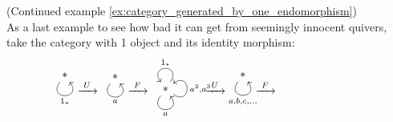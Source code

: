 \begin{example}{(Continued example \ref{ex:category_generated_by_one_endomorphism})}\label{ex:U-F-U-F_from_singleton}\\

As a last example to see how bad it can get from seemingly innocent quivers, take the category with 1 object and its identity morphism:
\[
\noindent\begin{minipage}{.005\textwidth}
\phantom{}
\end{minipage}
\begin{minipage}{.08\textwidth}
\begin{tikzcd}
\ast \arrow["1_{\ast}"', loop, distance=2em, in=305, out=235]
\end{tikzcd}
\end{minipage}
%
\begin{minipage}{.05\textwidth}
$\xrightarrow{\text{     }U\text{     }}$
\end{minipage}
%
\begin{minipage}{.08\textwidth}
\begin{tikzcd}
\ast \arrow["a"', loop, distance=2em, in=305, out=235]
\end{tikzcd}
\end{minipage}
%
\begin{minipage}{.05\textwidth}
$\xrightarrow{\text{     }F\text{     }}$
\end{minipage}
%
\begin{minipage}{.15\textwidth}
\begin{tikzcd}
\ast \arrow["a"', loop, distance=2em, in=305, out=235] \arrow["1_{\ast}"', loop, distance=2em, in=125, out=55] \arrow["{a^{2}, a^{3},\dots}"', loop, distance=2em, in=35, out=325]
\end{tikzcd}
\end{minipage}
%
\begin{minipage}{.05\textwidth}
$\xrightarrow{\text{     }U\text{     }}$
\end{minipage}
%
\begin{minipage}{.08\textwidth}
\begin{tikzcd}
\ast \arrow["{a, b, c,\dots}"', loop, distance=2em, in=305, out=235]
\end{tikzcd}
\end{minipage}
%
\begin{minipage}{.05\textwidth}
$\xrightarrow{\text{     }F\text{     }}$
\end{minipage}
%
\begin{minipage}{.25\textwidth}
\begin{tikzcd}

\end{tikzcd}
\end{minipage}\]
\end{example}
